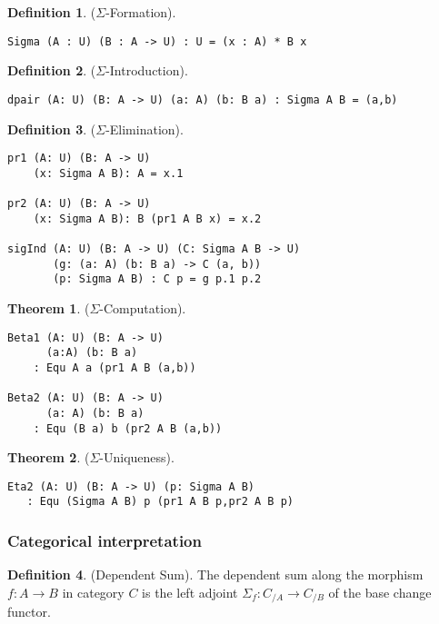 \documentclass[twoside]{article}
\theoremstyle{definition}
\newtheorem{theorem}{Theorem}
\newtheorem{definition}{Definition}
\begin{document}
\begin{definition} ($\Sigma$-Formation).
\begin{lstlisting}
Sigma (A : U) (B : A -> U) : U = (x : A) * B x
\end{lstlisting}
\end{definition}

\begin{definition} ($\Sigma$-Introduction).
\begin{lstlisting}
dpair (A: U) (B: A -> U) (a: A) (b: B a) : Sigma A B = (a,b)
\end{lstlisting}
\end{definition}

\begin{definition} ($\Sigma$-Elimination).
\begin{lstlisting}
pr1 (A: U) (B: A -> U)
    (x: Sigma A B): A = x.1

pr2 (A: U) (B: A -> U)
    (x: Sigma A B): B (pr1 A B x) = x.2

sigInd (A: U) (B: A -> U) (C: Sigma A B -> U)
       (g: (a: A) (b: B a) -> C (a, b))
       (p: Sigma A B) : C p = g p.1 p.2
\end{lstlisting}
\end{definition}

\begin{theorem} ($\Sigma$-Computation).
\begin{lstlisting}
Beta1 (A: U) (B: A -> U)
      (a:A) (b: B a)
    : Equ A a (pr1 A B (a,b))

Beta2 (A: U) (B: A -> U)
      (a: A) (b: B a)
    : Equ (B a) b (pr2 A B (a,b))
\end{lstlisting}
\end{theorem}

\begin{theorem} ($\Sigma$-Uniqueness).
\begin{lstlisting}
Eta2 (A: U) (B: A -> U) (p: Sigma A B)
   : Equ (Sigma A B) p (pr1 A B p,pr2 A B p)
\end{lstlisting}
\end{theorem}

\subsubsection*{Categorical interpretation}

\begin{definition} (Dependent Sum).
The dependent sum along the morphism $f: A \rightarrow B$ in category $C$ is the left
adjoint $\Sigma_f : C_{/A} \rightarrow C_{/B}$ of the base change functor.
\end{definition}
\end{document}

